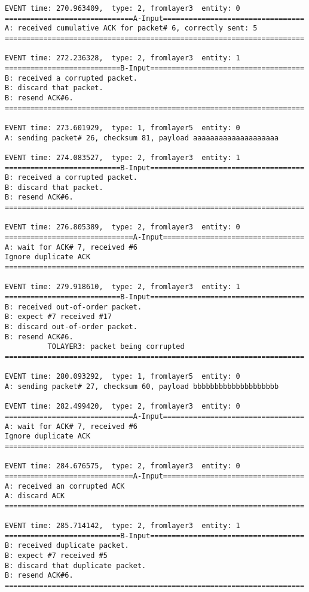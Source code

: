 \documentclass[12pt]{article}
\begin{document}
\begin{verbatim}
EVENT time: 270.963409,  type: 2, fromlayer3  entity: 0
==============================A-Input=================================
A: received cumulative ACK for packet# 6, correctly sent: 5
======================================================================

EVENT time: 272.236328,  type: 2, fromlayer3  entity: 1
===========================B-Input====================================
B: received a corrupted packet.
B: discard that packet.
B: resend ACK#6.
======================================================================

EVENT time: 273.601929,  type: 1, fromlayer5  entity: 0
A: sending packet# 26, checksum 81, payload aaaaaaaaaaaaaaaaaaaa

EVENT time: 274.083527,  type: 2, fromlayer3  entity: 1
===========================B-Input====================================
B: received a corrupted packet.
B: discard that packet.
B: resend ACK#6.
======================================================================

EVENT time: 276.805389,  type: 2, fromlayer3  entity: 0
==============================A-Input=================================
A: wait for ACK# 7, received #6
Ignore duplicate ACK
======================================================================

EVENT time: 279.918610,  type: 2, fromlayer3  entity: 1
===========================B-Input====================================
B: received out-of-order packet.
B: expect #7 received #17
B: discard out-of-order packet.
B: resend ACK#6.
          TOLAYER3: packet being corrupted
======================================================================

EVENT time: 280.093292,  type: 1, fromlayer5  entity: 0
A: sending packet# 27, checksum 60, payload bbbbbbbbbbbbbbbbbbbb

EVENT time: 282.499420,  type: 2, fromlayer3  entity: 0
==============================A-Input=================================
A: wait for ACK# 7, received #6
Ignore duplicate ACK
======================================================================

EVENT time: 284.676575,  type: 2, fromlayer3  entity: 0
==============================A-Input=================================
A: received an corrupted ACK 
A: discard ACK
======================================================================

EVENT time: 285.714142,  type: 2, fromlayer3  entity: 1
===========================B-Input====================================
B: received duplicate packet.
B: expect #7 received #5
B: discard that duplicate packet.
B: resend ACK#6.
======================================================================


\end{verbatim}
\end{document}
